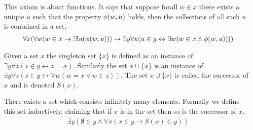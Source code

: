 \begin{axiom}
  This axiom is about functions. It says that suppose forall $w\in x$ there exists a unique $u$ such that the property $\phi(w,u)$ holds, then the collections of all such $u$ is contained in a set.
  \begin{align*}
    \forall x (\forall w (w\in x \to \exists ! u (\phi(w,u)))\to \exists y \forall u(u\in y \leftrightarrow \exists w(w\in x \land \phi(w,u))))
  \end{align*}
\end{axiom}
\begin{definition}
  Given a set $x$ the singleton set $\{x\}$ is defined as an instance of $\exists y \forall z(z\in y \leftrightarrow z=x)$. Similarly the set $x\cup \{x\}$ is an instance of $\exists y \forall z(z\in y \leftrightarrow \forall w(w = x \lor w\in z))$. The set $x\cup \{x\}$ is called the successor of $x$ and is denoted $S(x)$.
\end{definition}
\begin{axiom}
  There exists a set which consists infinitely many elements. Formally we define this set inductively, claiming that if $x$ is in the set then so is the successor of $x$.
  \begin{align*}
    \exists y (\emptyset \in y \land \forall x (x\in y \to S(x)\in y))
  \end{align*}
\end{axiom}

